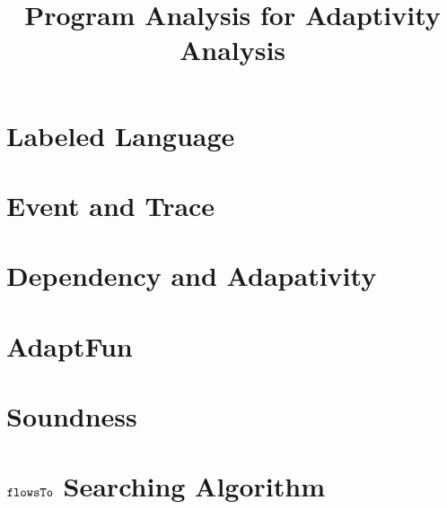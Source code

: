 \documentclass[a4paper,11pt]{article}
\newcommand{\THESYSTEM}{\textsf{AdaptFun}}
\begin{document}
\title{Program Analysis for Adaptivity Analysis}

\author{}

\date{}

\maketitle
%
% 
\section{Labeled Language}

\clearpage
\section{Event and Trace}


\clearpage
\section{Dependency and Adapativity}


% 
\clearpage
\section{\THESYSTEM}
\label{sec:adpfun}





\clearpage
\section{Soundness}

\clearpage
%
\clearpage
\section{$\mathtt{flowsTo}$ Searching Algorithm}

\end{document}
